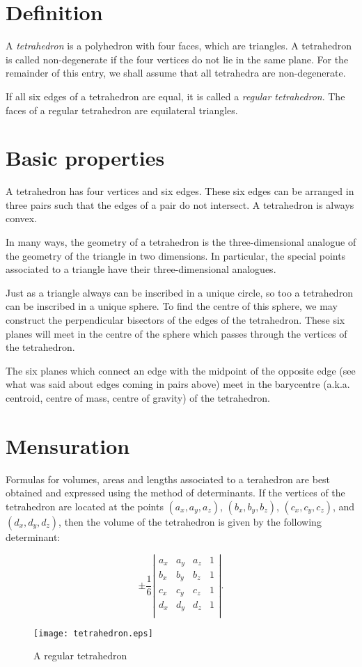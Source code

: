 \documentclass[12pt]{article}
\begin{document}
\section{Definition}

A \emph{tetrahedron} is a polyhedron with four faces, which are
triangles.  A tetrahedron is called non-degenerate if the four
vertices do not lie in the same plane.  For the remainder of this
entry, we shall assume that all tetrahedra are non-degenerate.

If all six edges of a tetrahedron are equal, it is called a
\emph{regular tetrahedron}.  The faces of a regular tetrahedron are
equilateral triangles.

\section{Basic properties}

A tetrahedron has four vertices and six edges.  These six edges can be
arranged in three pairs such that the edges of a pair do not
intersect.  A tetrahedron is always convex.

In many ways, the geometry of a tetrahedron is the three-dimensional
analogue of the geometry of the triangle in two dimensions.  In
particular, the special points associated to a triangle have their
three-dimensional analogues.

Just as a triangle always can be inscribed in a unique circle, so too
a tetrahedron can be inscribed in a unique sphere.  To find the centre
of this sphere, we may construct the perpendicular bisectors of the
edges of the tetrahedron.  These six planes will meet in the centre of
the sphere which passes through the vertices of the tetrahedron.

The six planes which connect an edge with the midpoint of the opposite
edge (see what was said about edges coming in pairs above) meet in the
barycentre (a.k.a. centroid, centre of mass, centre of gravity) of the
tetrahedron.

\section{Mensuration}

Formulas for volumes, areas and lengths associated to a terahedron are
best obtained and expressed using the method of determinants.  If the
vertices of the tetrahedron are located at the points $(a_x, a_y,
a_z)$, $(b_x, b_y, b_z)$, $(c_x, c_y, c_z)$, and $(d_x, d_y, d_z)$,
then the volume of the tetrahedron is given by the following
determinant:

\[ \pm\frac{1}{6} \left| \begin{matrix} a_x & a_y & a_z & 1 \\ b_x & b_y
& b_z & 1 \\ c_x & c_y & c_z & 1 \\ d_x & d_y & d_z & 1 \\
\end{matrix} \right|. \]

\begin{figure}
\begin{center}
\texttt{[image: tetrahedron.eps]}
\end{center}
\caption{A regular tetrahedron}
\end{figure}

\end{document}

